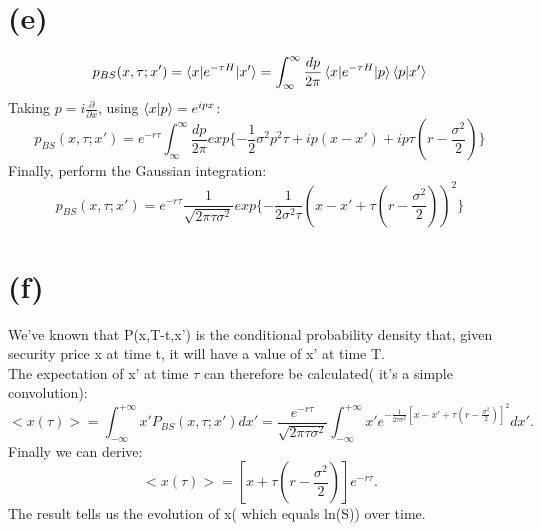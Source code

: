 \documentclass[12pt,a4paper]{paper}
\begin{document}
\section{(e)}
\begin{equation}
p_{BS}(x, \tau; x') = \braket{x|e^{-\tau H}|x'} = \int_{\infty}^{\infty} \frac{dp}{2\pi}\braket{x|e^{-\tau H}|p}\braket{p|x'}
\end{equation}
Taking $p = i \frac{\partial}{\partial x}$, using $\braket{x|p} = e^{ipx}$:
\begin{equation}
p_{BS}(x, \tau;x') = e^{-r\tau}\int_{\infty}^{\infty}\frac{dp}{2\pi}exp\{- \frac{1}{2}\sigma^2p^2\tau + ip(x - x') + ip\tau(r - \frac{\sigma^2}{2}) \}
\end{equation}
Finally, perform the Gaussian integration:
\begin{equation}
p_{BS}(x, \tau;x') = e^{-r\tau} \frac{1}{\sqrt{2\pi \tau \sigma^2}} exp\{ - \frac{1}{2 \sigma^2 \tau}(x - x' + \tau(r - \frac{\sigma^2}{2}) )^2 \}
\end{equation}

\section{(f)}
We've known that P(x,T-t,x') is the conditional probability density that, given security price x at time t, it will have a value of x' at time T.\\
\indent The expectation of x' at time $\tau$ can therefore be calculated( it's a simple convolution):
\begin{equation}
<x(\tau)>=\int_{-\infty }^{+\infty }x'P_{BS}(x,\tau;x')dx'=\frac{e^{-r\tau}}{\sqrt{2\pi \tau \sigma ^2}}\int_{-\infty }^{+\infty }x'e^{-\frac{1}{2\tau \sigma ^2}[x-x'+\tau(r-\frac{\sigma ^2}{2})]^2}dx'.
\end{equation}
\indent Finally we can derive:
\begin{equation}
<x(\tau)>=[x+\tau(r-\frac{\sigma ^2}{2})]e^{-r\tau}.
\end{equation}
The result tells us the evolution of x( which equals ln(S)) over time.
\end{document}
